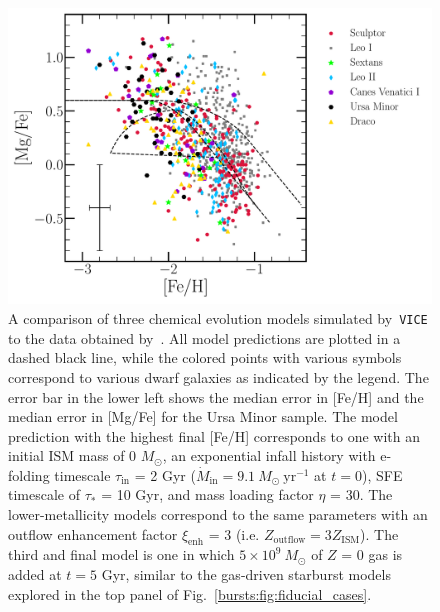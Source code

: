 \begin{figure} %
\includegraphics[scale = 0.34]{./chapter2/kirby2010.pdf} 
\caption{
A comparison of three chemical evolution models simulated by~\texttt{VICE} to 
the data obtained by~\citet{Kirby2010}. All model predictions are plotted in a 
dashed black line, while the colored points with various symbols correspond to 
various dwarf galaxies as indicated by the legend. The error bar in the lower 
left shows the median error in [Fe/H] and the median error in [Mg/Fe] for the 
Ursa Minor sample. The model prediction with the highest final [Fe/H] 
corresponds to one with an initial ISM mass of 0 $M_\odot$, an exponential 
infall history with e-folding timescale $\tau_\text{in}$ = 2 Gyr 
($\dot{M}_\text{in} = 9.1\ M_\odot\ \text{yr}^{-1}$ at $t = 0$), SFE 
timescale of $\tau_*$ = 10 Gyr, and mass loading factor $\eta$ = 30. The 
lower-metallicity models correspond to the same parameters with an outflow 
enhancement factor $\xi_\text{enh}$ = 3 (i.e. $Z_\text{outflow} = 
3Z_\text{ISM}$). The third and final model is one in which $5\times10^9\ 
M_\odot$ of $Z$ = 0 gas is added at $t = 5$ Gyr, similar to the gas-driven 
starburst models explored in the top panel of Fig.~\ref{bursts:fig:fiducial_cases}. 
}
\label{bursts:fig:kirby2010} 
\end{figure} 

